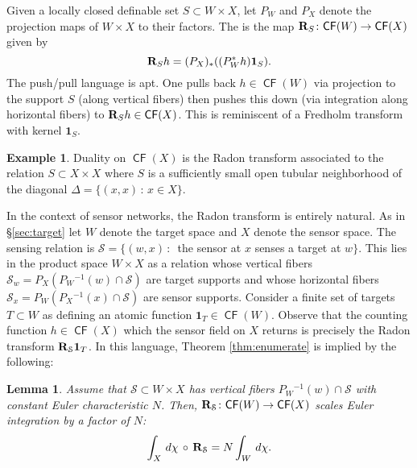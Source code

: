 \documentclass{psapm-l}
\newtheorem{lemma}[theorem]{Lemma}
\theoremstyle{definition}
\newtheorem{example}[theorem]{Example}
\theoremstyle{remark}
\numberwithin{equation}{section}
\begin{document}
Given a locally closed definable set $S\subset W\times X$, let $P_W$ and $P_X$ denote the projection maps of $W\times X$ to their factors. The {{}} is the map ${{\bf R}}_S\colon{{{\operatorname{\mathsf{{CF}}}}}}(W)\to {{{\operatorname{\mathsf{{CF}}}}}}(X)$ given by
\begin{equation}
    {{\bf R}}_S h = (P_X)_*((P_W^*h){{\mathbf{1}}}_S) .
\end{equation}
The push/pull language is apt. One pulls back $h\in{{{\operatorname{\mathsf{{CF}}}}}}(W)$ via projection to the support $S$ (along vertical fibers) then pushes this down (via integration along horizontal fibers) to ${{\bf R}}_S h\in{{{\operatorname{\mathsf{{CF}}}}}}(X)$. This is reminiscent of a Fredholm transform with kernel ${{\mathbf{1}}}_S$.

\begin{example}
Duality on ${{{\operatorname{\mathsf{{CF}}}}}}(X)$ is the Radon transform associated to the relation $S\subset X\times X$ where $S$ is a sufficiently small open tubular neighborhood of the diagonal $\Delta=\{(x,x)\,\colon\,x\in X\}$.
\end{example}

In the context of sensor networks, the Radon transform is entirely natural. As in \S\ref{sec:target} let $W$ denote the  target space and $X$ denote the sensor space. The sensing relation is ${{\mathcal S}} = \{(w,x)\, :$~the sensor at $x$ senses a target at $w \}$. This lies in the product space $W\times X$ as a relation whose vertical fibers ${{\mathcal S}}_w=P_X(P_W{^{-1}}(w)\cap{{\mathcal S}})$ are target supports and whose horizontal fibers ${{\mathcal S}}_x=P_W(P_X{^{-1}}(x)\cap{{\mathcal S}})$ are sensor supports. Consider a finite set of targets $T\subset W$ as defining an atomic function ${{\mathbf{1}}}_T\in {{{\operatorname{\mathsf{{CF}}}}}}(W)$. Observe that the counting function $h\in{{{\operatorname{\mathsf{{CF}}}}}}(X)$ which the sensor field on $X$ returns is precisely the Radon transform ${{\bf R}}_{{\mathcal S}}{{\mathbf{1}}}_T$. In this language, Theorem \ref{thm:enumerate} is implied by the following:

\begin{lemma}
\label{lem:radon}
Assume that ${{\mathcal S}}\subset W\times X$ has vertical fibers $P_W{^{-1}}(w)\cap {{\mathcal S}}$ with constant Euler characteristic $N$. Then, ${{\bf R}}_{{\mathcal S}}\colon{{{\operatorname{\mathsf{{CF}}}}}}(W)\to {{{\operatorname{\mathsf{{CF}}}}}}(X)$ scales Euler integration by a factor of $N$:
\[
    \int_X\,d\chi\,\circ\,{{\bf R}}_{{\mathcal S}} = N \int_W\,d\chi .
\]
\end{lemma}
\end{document}
